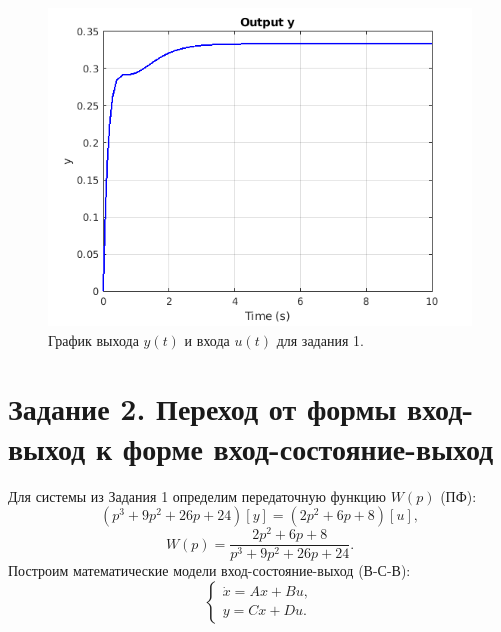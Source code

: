 \begin{figure}[htbp]
    \centering
    \includegraphics[width=0.7\linewidth]{figs/task_1_out.png}
    \caption{График выхода $y(t)$ и входа $u(t)$ для задания 1.}
    \label{fig:task_1_y}
\end{figure}




\section*{Задание 2. Переход от формы вход-выход к форме вход-состояние-выход}

Для системы из Задания 1 определим передаточную функцию $W(p)$ (ПФ):
$$
(p^3+9p^2+26p+24)[y]=(2p^2+6p+8)[u],
$$
\begin{equation}
    \label{eq:pf1}
    W(p)=\frac{2p^2+6p+8}{p^3+9p^2+26p+24}.
\end{equation}
Построим  математические модели вход-состояние-выход (В-С-В):
\begin{equation*}
    \begin{cases}
        \dot x = Ax + Bu,\\
        y = Cx + Du.
    \end{cases}
\end{equation*}

